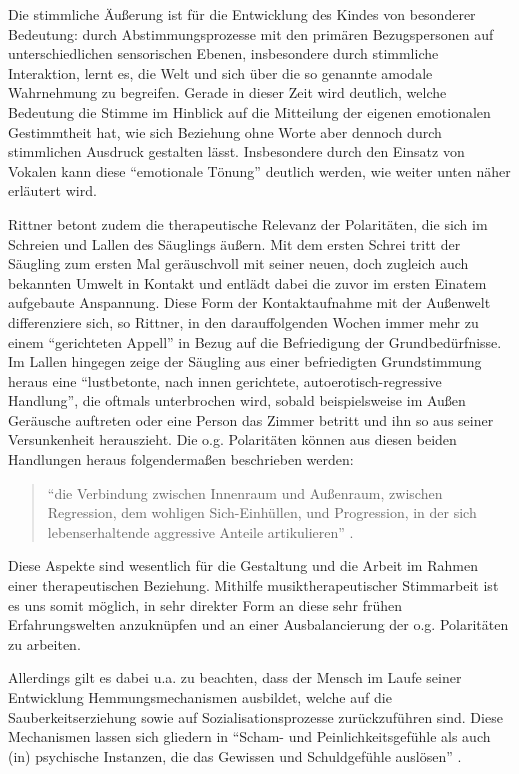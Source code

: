 Die stimmliche Äußerung ist für die Entwicklung des Kindes von besonderer Bedeutung: durch Abstimmungsprozesse mit den primären Bezugspersonen auf unterschiedlichen sensorischen Ebenen, insbesondere durch stimmliche Interaktion, lernt es, die Welt und sich über die so genannte amodale Wahrnehmung zu begreifen. Gerade in dieser Zeit wird deutlich, welche Bedeutung die Stimme im Hinblick auf die Mitteilung der eigenen emotionalen Gestimmtheit hat, wie sich Beziehung ohne Worte aber dennoch durch stimmlichen Ausdruck gestalten lässt. Insbesondere durch den Einsatz von Vokalen kann diese "`emotionale Tönung"' \autocite[205]{rittner2008} deutlich werden, wie weiter unten näher erläutert wird.

Rittner \autocite [vgl.][106f.]{rittner1990} betont zudem die therapeutische Relevanz der Polaritäten, die sich im Schreien und Lallen des Säuglings äußern. Mit dem ersten Schrei tritt der Säugling zum ersten Mal geräuschvoll mit seiner neuen, doch zugleich auch bekannten Umwelt in Kontakt und entlädt dabei die zuvor im ersten Einatem aufgebaute Anspannung. Diese Form der Kontaktaufnahme mit der Außenwelt differenziere sich, so Rittner, in den darauffolgenden Wochen immer mehr zu einem "`gerichteten Appell"' in Bezug auf die Befriedigung der Grundbedürfnisse. Im Lallen hingegen zeige der Säugling aus einer befriedigten Grundstimmung heraus eine "`lustbetonte, nach innen gerichtete, autoerotisch-regressive Handlung"', die oftmals unterbrochen wird, sobald beispielsweise im Außen Geräusche auftreten oder eine Person das Zimmer betritt und ihn so aus seiner Versunkenheit herauszieht. 
Die o.g. Polaritäten können aus diesen beiden Handlungen heraus folgendermaßen beschrieben werden: 

\begin{quote}
\onehalfspacing
"`die Verbindung zwischen Innenraum und Außenraum, zwischen Regression, dem wohligen Sich-Einhüllen, und Progression, in der sich lebenserhaltende aggressive Anteile artikulieren"' \autocite[106f.]{rittner1990}. 
\end{quote}

Diese Aspekte sind wesentlich für die Gestaltung und die Arbeit im Rahmen einer therapeutischen Beziehung. Mithilfe musiktherapeutischer Stimmarbeit ist es uns somit möglich, in sehr direkter Form an diese sehr frühen Erfahrungswelten anzuknüpfen und an einer Ausbalancierung der o.g. Polaritäten zu arbeiten. 

Allerdings gilt es dabei u.a. zu beachten, dass der Mensch im Laufe seiner Entwicklung Hemmungsmechanismen ausbildet, welche auf die Sauberkeitserziehung sowie auf Sozialisationsprozesse zurückzuführen sind. Diese Mechanismen lassen sich gliedern in "`Scham- und Peinlichkeitsgefühle als auch (in) psychische Instanzen, die das Gewissen und Schuldgefühle auslösen"' \autocite [106f.]{rittner1990}. 

